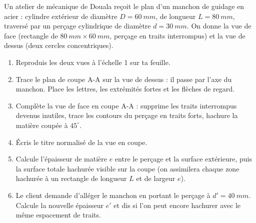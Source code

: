 \documentclass[11pt]{article}
\newcounter{popsec}
\newcounter{popsub}
\newcommand{\courssub}[1]{%
  \stepcounter{popsub}%
  \par\vspace{9pt}\noindent{\popxbold\fontsize{11.5}{13}\selectfont\color{popink}{\color{poporange}\thepopsec.\thepopsub}\hspace{6pt}#1}\par\nopagebreak\vspace{4pt}
}
\begin{document}
\courssub{Je me prépare au Bac}

\begin{exercice}
Un atelier de mécanique de Douala reçoit le plan d'un manchon de guidage en acier : cylindre extérieur de diamètre $D = \SI{60}{mm}$, de longueur $L = \SI{80}{mm}$, traversé par un perçage cylindrique de diamètre $d = \SI{30}{mm}$. On donne la vue de face (rectangle de $\SI{80}{mm} \times \SI{60}{mm}$, perçage en traits interrompus) et la vue de dessus (deux cercles concentriques).
\begin{enumerate}
\item Reproduis les deux vues à l'échelle 1 sur ta feuille.
\item Trace le plan de coupe A-A sur la vue de dessus : il passe par l'axe du manchon. Place les lettres, les extrémités fortes et les flèches de regard.
\item Complète la vue de face en coupe A-A : supprime les traits interrompus devenus inutiles, trace les contours du perçage en traits forts, hachure la matière coupée à $45^{\circ}$.
\item Écris le titre normalisé de la vue en coupe.
\item Calcule l'épaisseur de matière $e$ entre le perçage et la surface extérieure, puis la surface totale hachurée visible sur la coupe (on assimilera chaque zone hachurée à un rectangle de longueur $L$ et de largeur $e$).
\item Le client demande d'alléger le manchon en portant le perçage à $d' = \SI{40}{mm}$. Calcule la nouvelle épaisseur $e'$ et dis si l'on peut encore hachurer avec le même espacement de traits.
\end{enumerate}
\end{exercice}
\end{document}
